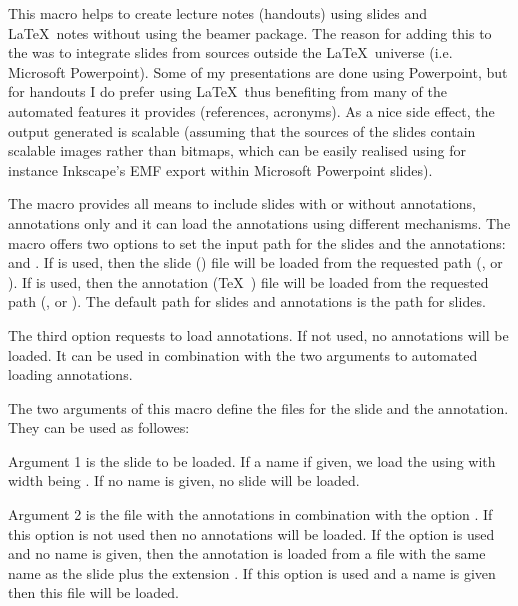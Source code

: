 
\DescribeMacro{\skbslide}
This macro helps to create lecture notes (handouts) using  slides and \LaTeX~notes
without using the beamer package. The reason for adding this to the  was to integrate
slides from sources outside the \LaTeX~universe (i.e. Microsoft Powerpoint). Some of my 
presentations are done using Powerpoint, but for handouts I do prefer using \LaTeX~thus
benefiting from many of the automated features it provides (references, acronyms). As a nice
side effect, the output generated is scalable (assuming that the  sources of the slides
contain scalable images rather than bitmaps, which can be easily realised using for instance
Inkscape's EMF export within Microsoft Powerpoint slides).

The macro \cmd{\skbslide}
provides all means to include  slides with or without annotations, annotations only and
it can load the annotations using different mechanisms.
The macro offers two options to set the input
path for the slides and the annotations:  and . 
If  is used, then the slide () file will be loaded from the requested path (,  or ).
If  is used, then the annotation (\TeX~) file will be loaded from the requested path (,  or ).
The default path for slides and annotations is the path for slides.

The third option  requests to load annotations. If not used, no annotations will be loaded. It can be used in 
combination with the two arguments to automated loading annotations.

The two arguments of this macro define the files for the slide and the annotation. They can be used as followes:
\begin{skbnotelist}
  \item Argument 1 is the slide to be loaded. If a name if given, we load the  using  with width being \cmd{\textwidth}. If no 
        name is given, no slide will be loaded.
  \item Argument 2 is the file with the annotations in combination with the option . If this option is not used then
        no annotations will be loaded. If the option is used and no name is given, then the annotation is loaded from a file with the 
        same name as the slide plus the extension . If this option is used and a name is given then this file will be loaded.
\end{skbnotelist}

